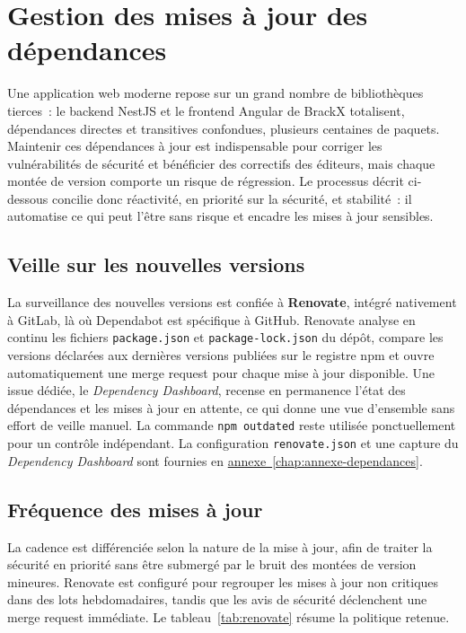 \section{Gestion des mises à jour des dépendances}
\label{sec:dependances}

Une application web moderne repose sur un grand nombre de bibliothèques tierces~: le backend NestJS et le frontend Angular de BrackX totalisent, dépendances directes et transitives confondues, plusieurs centaines de paquets. Maintenir ces dépendances à jour est indispensable pour corriger les vulnérabilités de sécurité et bénéficier des correctifs des éditeurs, mais chaque montée de version comporte un risque de régression. Le processus décrit ci-dessous concilie donc réactivité, en priorité sur la sécurité, et stabilité~: il automatise ce qui peut l'être sans risque et encadre les mises à jour sensibles.

\subsection{Veille sur les nouvelles versions}
La surveillance des nouvelles versions est confiée à \textbf{Renovate}, intégré nativement à GitLab, là où Dependabot est spécifique à GitHub. Renovate analyse en continu les fichiers \texttt{package.json} et \texttt{package-lock.json} du dépôt, compare les versions déclarées aux dernières versions publiées sur le registre npm et ouvre automatiquement une merge request pour chaque mise à jour disponible. Une issue dédiée, le \emph{Dependency Dashboard}, recense en permanence l'état des dépendances et les mises à jour en attente, ce qui donne une vue d'ensemble sans effort de veille manuel. La commande \texttt{npm outdated} reste utilisée ponctuellement pour un contrôle indépendant. La configuration \texttt{renovate.json} et une capture du \emph{Dependency Dashboard} sont fournies en \hyperref[chap:annexe-dependances]{annexe~\ref*{chap:annexe-dependances}}.

\subsection{Fréquence des mises à jour}
La cadence est différenciée selon la nature de la mise à jour, afin de traiter la sécurité en priorité sans être submergé par le bruit des montées de version mineures. Renovate est configuré pour regrouper les mises à jour non critiques dans des lots hebdomadaires, tandis que les avis de sécurité déclenchent une merge request immédiate. Le tableau~\ref{tab:renovate} résume la politique retenue.

